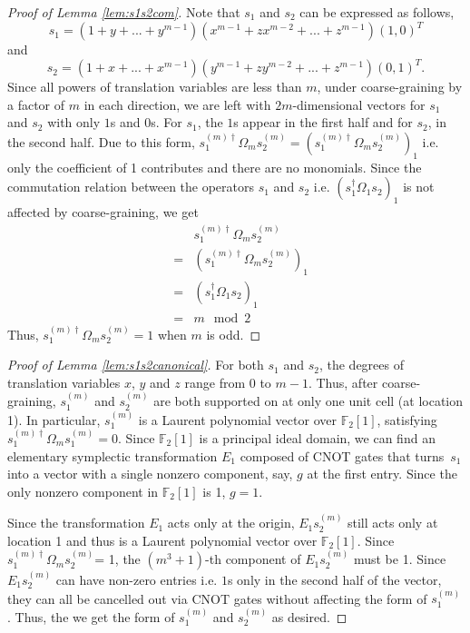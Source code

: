 \documentclass[prx,twocolumn,superscriptaddress,nofootinbib,showpacs,notitlepage]{revtex4-2}
\newcommand{\beq}{\begin{eqnarray}}
\newcommand{\eeq}{\end{eqnarray}}
\newcommand{\FF}{{\mathbb{F}}}
\newcommand{\arpit}[1]{{\color{ultramarine}\footnotesize{(AD) #1}}}
\begin{document}
\begin{proof}[Proof of Lemma \ref{lem:s1s2com}]
Note that $s_1$ and $s_2$ can be expressed as follows,
$$s_1=(1+y+...+y^{m-1})(x^{m-1}+zx^{m-2}+...+z^{m-1})(1,0)^T$$
and
$$s_2=(1+x+...+x^{m-1})(y^{m-1}+zy^{m-2}+...+z^{m-1})(0,1)^T.$$ Since all powers of translation variables are less than $m$, under coarse-graining by a factor of $m$ in each direction, we are left with $2m$-dimensional vectors for $s_1$ and $s_2$ with only $1$s and $0$s. For $s_1$, the $1$s appear in the first half and for $s_2$, in the second half. Due to this form, $s_1^{(m)\dagger}\Omega_ms_2^{(m)}=(s_1^{(m)\dagger}\Omega_ms_2^{(m)})_1$ i.e. only the coefficient of 1 contributes and there are no monomials. Since the commutation relation between the operators $s_1$ and $s_2$ i.e. $ (s_1^{\dagger}\Omega_1 s_2)_1$ is not affected by coarse-graining, we get 
\beq
&&s_1^{(m)\dagger}\Omega_ms_2^{(m)}\nonumber\\
&=&(s_1^{(m)\dagger}\Omega_ms_2^{(m)})_1 \nonumber\\
&=& (s_1^{\dagger}\Omega_1 s_2)_1  \nonumber\\
&=& m \mod 2 
\eeq 
Thus, $s_1^{(m)\dagger}\Omega_ms_2^{(m)}=1$ when $m$ is odd.

\end{proof}

\begin{proof}[Proof of Lemma \ref{lem:s1s2canonical}]

For both $s_1$ and $s_2$, the degrees of translation variables $x$, $y$ and $z$ range from 0 to $m-1$.  Thus, after coarse-graining, $s_1^{(m)}$ and $s_2^{(m)}$ are both supported on at only one unit cell (at location 1). In particular, $s_1^{(m)}$ is a Laurent polynomial vector over $\FF_2[1]$,
satisfying $s_1^{(m)\dagger} \Omega_m s_1^{(m)} = 0$.
Since $\FF_2[1]$ is a principal ideal domain,
we can find an elementary symplectic transformation $E_1$
composed of CNOT gates that turns~$s_1$ into a vector with a single nonzero component, say, $g$ at the first entry. Since the only nonzero component in $\FF_2[1]$ is 1, $g=1$.

Since the transformation $E_1$ acts only at the origin, $E_1s_2^{(m)}$ still acts only at location 1 and thus is a Laurent polynomial vector over $\FF_2[1]$.  Since $s_1^{(m)\dagger}\Omega_m s_2^{(m)}$= 1, the $(m^3+1)$-th component of $E_1s_2^{(m)}$ must be 1. Since $E_1s_2^{(m)}$ can have non-zero entries i.e. $1$s only in the second half of the vector, they can all be cancelled out via CNOT gates without affecting the form of $s_1^{(m)}$. Thus, the we get the form of $s_1^{(m)}$ and $s_2^{(m)}$ as desired.
\end{proof}
\end{document}
